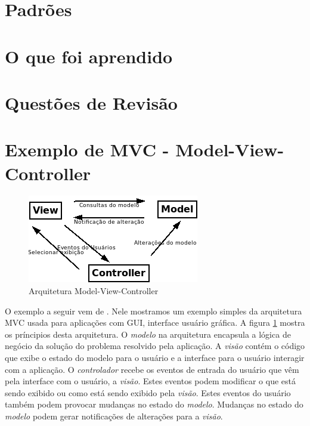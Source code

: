 \documentclass[
	article,			%
	12pt,				%
	openright,
	twoside,			%
	a4paper,			%
	english,			%
	french,
	brazil,				%
	sumario=tradicional
	]{abntex2}
\begin{document}
\section{Padrões}

\section{O que foi aprendido}

\section{Questões de Revisão}

\pagebreak
\section{Exemplo de MVC - Model-View-Controller}

\begin{figure}[h]
\begin{center}
\includegraphics[scale=0.7]{MVC.png} 
\caption{Arquitetura Model-View-Controller} \label{fig:mvc}
\end{center}
\end{figure}

O exemplo a seguir vem de . Nele mostramos um exemplo simples da arquitetura MVC usada para aplicações com GUI, interface usuário gráfica. A figura \ref{fig:mvc} mostra os príncipios desta arquitetura. O \emph{modelo} na arquitetura encapsula a lógica de negócio da solução do problema resolvido pela aplicação. A \emph{visão} contém o código que exibe o estado do modelo para o usuário e a interface para o usuário interagir com a aplicação. O \emph{controlador} recebe os eventos de entrada do usuário que vêm pela interface com o usuário, a \emph{visão}. Estes eventos podem modificar o que está sendo exibido ou como está sendo exibido pela \emph{visão}. Estes eventos do usuário também podem provocar mudanças no estado do \emph{modelo}. Mudanças no estado do \emph{modelo} podem gerar notificações de alterações para a \emph{visão}.
\end{document}
